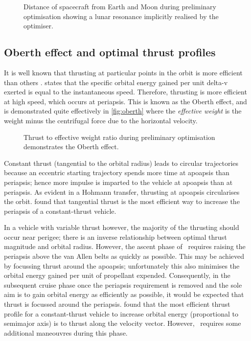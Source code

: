 \begin{figure}
\centering
\def\svgwidth{\figurewidth}

\caption{Distance of spacecraft from Earth and Moon during preliminary optimisation showing a lunar resonance implicitly realised by the optimiser.} \label{fig:Lunar-resonance2}
\end{figure}




\subsection{Oberth effect and optimal thrust profiles} \label{sub:Oberth}

It is well known that thrusting at particular points in the orbit is more efficient than others \parencite{Kemble2006}. \textcite{Oberth1923} states that the specific orbital energy gained per unit delta-v exerted is equal to the instantaneous speed. Therefore, thrusting is more efficient at high speed, which occurs at periapsis. This is known as the Oberth effect, and is demonstrated quite effectively in \autoref{fig:oberth} where the \emph{effective weight} is the weight minus the centrifugal force due to the horizontal velocity.

\begin{figure}
\centering
\def\svgwidth{\figurewidth}

\caption{Thrust to effective weight ratio during preliminary optimisation demonstrates the Oberth effect.} \label{fig:oberth}
\end{figure}

Constant thrust (tangential to the orbital radius) leads to circular trajectories because an eccentric starting trajectory spends more time at apoapsis than periapsis; hence more impulse is imparted to the vehicle at apoapsis than at periapsis. As evident in a Hohmann transfer, thrusting at apoapsis circularises the orbit. \textcite{Racca9} found that tangential thrust is the most efficient way to increase the periapsis of a constant-thrust vehicle.

In a vehicle with variable thrust however, the majority of the thrusting should occur near perigee; there is an inverse relationship between optimal thrust magnitude and orbital radius. However, the ascent phase of \BW\ requires raising the periapsis above the van Allen belts as quickly as possible. This may be achieved by focussing thrust around the apoapsis; unfortunately this also minimises the orbital energy gained per unit of propellant expended. Consequently, in the subsequent cruise phase once the periapsis requirement is removed and the sole aim is to gain orbital energy as efficiently as possible, it would be expected that thrust is focussed around the periapsis. \textcite{Racca9} found that the most efficient thrust profile for a constant-thrust vehicle to increase orbital energy (proportional to semimajor axis) is to thrust along the velocity vector. However, \BW\ requires some additional maneouvres during this phase. 

